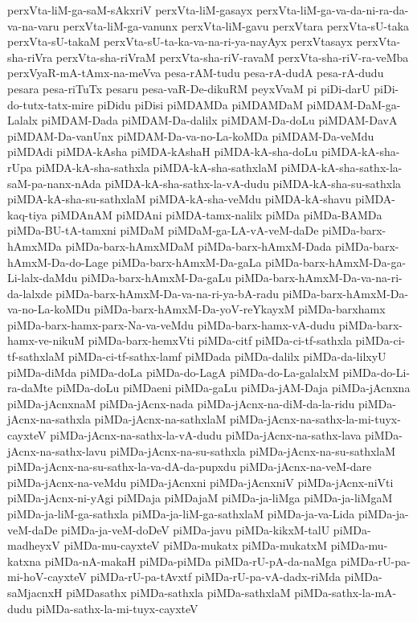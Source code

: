 {perxVta-liM-ga-saM-sAkxriV
perxVta-liM-gasayx
perxVta-liM-ga-va-da-ni-ra-da-va-na-varu
perxVta-liM-ga-vanunx
perxVta-liM-gavu
perxVtara
perxVta-sU-taka
perxVta-sU-takaM
perxVta-sU-ta-ka-va-na-ri-ya-nayAyx
perxVtasayx
perxVta-sha-riVra
perxVta-sha-riVraM
perxVta-sha-riV-ravaM
perxVta-sha-riV-ra-veMba
perxVyaR-mA-tAmx-na-meVva
pesa-rAM-tudu
pesa-rA-dudA
pesa-rA-dudu
pesara
pesa-riTuTx
pesaru
pesa-vaR-De-dikuRM
peyxVvaM
pi
piDi-darU
piDi-do-tutx-tatx-mire
piDidu
piDisi
piMDAMDa
piMDAMDaM
piMDAM-DaM-ga-Lalalx
piMDAM-Dada
piMDAM-Da-dalilx
piMDAM-Da-doLu
piMDAM-DavA
piMDAM-Da-vanUnx
piMDAM-Da-va-no-La-koMDa
piMDAM-Da-veMdu
piMDAdi
piMDA-kAsha
piMDA-kAshaH
piMDA-kA-sha-doLu
piMDA-kA-sha-rUpa
piMDA-kA-sha-sathxla
piMDA-kA-sha-sathxlaM
piMDA-kA-sha-sathx-la-saM-pa-nanx-nAda
piMDA-kA-sha-sathx-la-vA-dudu
piMDA-kA-sha-su-sathxla
piMDA-kA-sha-su-sathxlaM
piMDA-kA-sha-veMdu
piMDA-kA-shavu
piMDA-kaq-tiya
piMDAnAM
piMDAni
piMDA-tamx-nalilx
piMDa
piMDa-BAMDa
piMDa-BU-tA-tamxni
piMDaM
piMDaM-ga-LA-vA-veM-daDe
piMDa-barx-hAmxMDa
piMDa-barx-hAmxMDaM
piMDa-barx-hAmxM-Dada
piMDa-barx-hAmxM-Da-do-Lage
piMDa-barx-hAmxM-Da-gaLa
piMDa-barx-hAmxM-Da-ga-Li-lalx-daMdu
piMDa-barx-hAmxM-Da-gaLu
piMDa-barx-hAmxM-Da-va-na-ri-da-lalxde
piMDa-barx-hAmxM-Da-va-na-ri-ya-bA-radu
piMDa-barx-hAmxM-Da-va-no-La-koMDu
piMDa-barx-hAmxM-Da-yoV-reYkayxM
piMDa-barxhamx
piMDa-barx-hamx-parx-Na-va-veMdu
piMDa-barx-hamx-vA-dudu
piMDa-barx-hamx-ve-nikuM
piMDa-barx-hemxVti
piMDa-citf
piMDa-ci-tf-sathxla
piMDa-ci-tf-sathxlaM
piMDa-ci-tf-sathx-lamf
piMDada
piMDa-dalilx
piMDa-da-lilxyU
piMDa-diMda
piMDa-doLa
piMDa-do-LagA
piMDa-do-La-galalxM
piMDa-do-Li-ra-daMte
piMDa-doLu
piMDaeni
piMDa-gaLu
piMDa-jAM-Daja
piMDa-jAcnxna
piMDa-jAcnxnaM
piMDa-jAcnx-nada
piMDa-jAcnx-na-diM-da-la-ridu
piMDa-jAcnx-na-sathxla
piMDa-jAcnx-na-sathxlaM
piMDa-jAcnx-na-sathx-la-mi-tuyx-cayxteV
piMDa-jAcnx-na-sathx-la-vA-dudu
piMDa-jAcnx-na-sathx-lava
piMDa-jAcnx-na-sathx-lavu
piMDa-jAcnx-na-su-sathxla
piMDa-jAcnx-na-su-sathxlaM
piMDa-jAcnx-na-su-sathx-la-va-dA-da-pupxdu
piMDa-jAcnx-na-veM-dare
piMDa-jAcnx-na-veMdu
piMDa-jAcnxni
piMDa-jAcnxniV
piMDa-jAcnx-niVti
piMDa-jAcnx-ni-yAgi
piMDaja
piMDajaM
piMDa-ja-liMga
piMDa-ja-liMgaM
piMDa-ja-liM-ga-sathxla
piMDa-ja-liM-ga-sathxlaM
piMDa-ja-va-Lida
piMDa-ja-veM-daDe
piMDa-ja-veM-doDeV
piMDa-javu
piMDa-kikxM-talU
piMDa-madheyxV
piMDa-mu-cayxteV
piMDa-mukatx
piMDa-mukatxM
piMDa-mu-katxna
piMDa-nA-makaH
piMDa-piMDa
piMDa-rU-pA-da-naMga
piMDa-rU-pa-mi-hoV-cayxteV
piMDa-rU-pa-tAvxtf
piMDa-rU-pa-vA-dadx-riMda
piMDa-saMjacnxH
piMDasathx
piMDa-sathxla
piMDa-sathxlaM
piMDa-sathx-la-mA-dudu
piMDa-sathx-la-mi-tuyx-cayxteV
}
